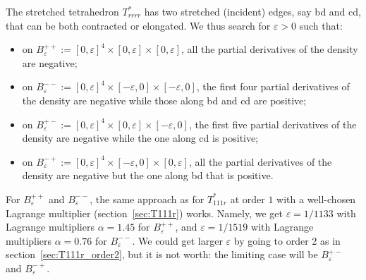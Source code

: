 \documentclass[11pt]{article}
\begin{document}
The stretched tetrahedron $T_{rrrr}^*$ has two stretched (incident) edges, say bd and cd, that can be both contracted or elongated.
We thus search for $\varepsilon>0$ such that:
\begin{itemize}
\item
on $B^{++}_\varepsilon:=[0,\varepsilon]^4\times [0,\varepsilon]\times [0,\varepsilon]$, all the partial derivatives of the density are negative;
\item
on $B^{--}_\varepsilon:=[0,\varepsilon]^4\times [-\varepsilon,0]\times [-\varepsilon,0]$, the first four partial derivatives of the density are negative while those along bd and cd are positive;
\item
on $B^{+-}_\varepsilon:=[0,\varepsilon]^4\times [0,\varepsilon]\times [-\varepsilon,0]$, the first five partial derivatives of the density are negative while the one along cd is positive;
\item
on $B^{-+}_\varepsilon:=[0,\varepsilon]^4\times [-\varepsilon,0]\times [0,\varepsilon]$, all the partial derivatives of the density are negative but the one along bd that is positive.
\end{itemize}

For $B^{++}_\varepsilon$ and $B^{--}_\varepsilon$, the same approach as for $T_{111r}^*$ at order $1$ with a well-chosen Lagrange multiplier (section~\ref{sec:T111r}) works.
Namely, we get $\varepsilon=1/1133$ with Lagrange multipliers $\alpha=1.45$ for $B^{++}_\varepsilon$,
and $\varepsilon=1/1519$ with Lagrange multipliers $\alpha=0.76$ for $B^{--}_\varepsilon$.
We could get larger $\varepsilon$ by going to order $2$ as in section~\ref{sec:T111r_order2}, but it is not worth: the limiting case will be $B^{+-}_\varepsilon$ and $B^{-+}_\varepsilon$.
\end{document}
